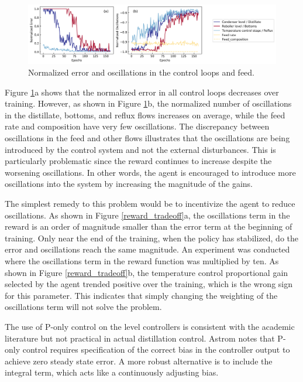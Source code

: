 \begin{figure}[t]
  \includegraphics[width=1.2\textwidth]{gfx/Chapter05/dis3_74_errors_oscillations}
  \caption{Normalized error and oscillations in the control loops and feed.}
  \label{errors_oscillations}
\end{figure}

Figure \ref{errors_oscillations}a shows that the normalized error in all control loops decreases over training. However, as shown in Figure \ref{errors_oscillations}b, the normalized number of oscillations in the distillate, bottoms, and reflux flows increases on average, while the feed rate and composition have very few oscillations. The discrepancy between oscillations in the feed and other flows illustrates that the oscillations are being introduced by the control system and not the external disturbances. This is particularly problematic since the reward continues to increase despite the worsening oscillations. In other words, the agent is encouraged to introduce more oscillations into the system by increasing the magnitude of the gains.

The simplest remedy to this problem would be to incentivize the agent to reduce oscillations. As shown in Figure \ref{reward_tradeoff}a, the oscillations term in the reward is an order of magnitude smaller than the error term at the beginning of training. Only near the end of the training, when the policy has stabilized, do the error and oscillations reach the same magnitude. An experiment was conducted where the oscillations term in the reward function was multiplied by ten. As shown in Figure \ref{reward_tradeoff}b, the temperature control proportional gain selected by the agent trended positive over the training, which is the wrong sign for this parameter. This indicates that simply changing the weighting of the oscillations term will not solve the problem.

The use of P-only control on the level controllers is consistent with the academic literature\cite{Skogestad1988} but not practical in actual distillation control. Astrom notes that P-only control requires specification of the correct bias in the controller output to achieve zero steady state error.\cite{Astrom2006} A more robust alternative is to include the integral term, which acts like a continuously adjusting bias.


